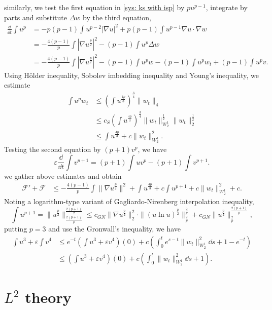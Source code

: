 similarly, we test the first equation in \eqref{sys: ks with isp} by $pu^{p-1}$, integrate by parts and substitute $\Delta w$ by the third equation,
\begin{align*}
  \frac{\dd}{\dd t}\int u^p &= -p(p-1)\int u^{p-2}|\nabla u|^2 
  + p(p-1)\int u^{p-1}\nabla u\cdot\nabla w\\
  &= -\frac{4(p-1)}{p}\int |\nabla u^{\frac{p}2}|^2 - (p-1)\int u^p\Delta w\\
  &= -\frac{4(p-1)}{p}\int |\nabla u^{\frac{p}2}|^2 
  - (p-1)\int u^p w - (p-1)\int u^pw_t + (p-1)\int u^p v.
\end{align*} 
Using H\"older inequality, Sobolev imbedding inequality and Young's inequality, we estimate
\begin{align*}
    \int u^pw_t &\leq\left(\int u^{\frac{4p}3}\right)^{\frac34}\|w_t\|_4\\
    &\leq c_S\left(\int u^{\frac{4p}3}\right)^{\frac34}\|w_t\|_{W^1_2}^{\frac12}\|w_t\|_2^{\frac12}\\
    &\leq \int u^{\frac{4p}{3}} + c\|w_t\|_{W^1_2}^2.
\end{align*}
Testing the second equation by $(p+1)v^p$, we have
\[
    \varepsilon\frac{\dd}{\dd t}\int v^{p+1} = (p+1)\int uv^p - (p+1)\int v^{p+1}.
\]
we gather above estimates and obtain 
\begin{align*}
    \mathcal{F}' + \mathcal{F} &\leq
    - \frac{4(p-1)}{p}\int\|\nabla u^{\frac{p}{2}}\|^2
    + \int u^{\frac{4p}3} + c\int u^{p+1} + c\|w_t\|_{W^1_2}^2 + c.
\end{align*} 
Noting a logarithm-type variant of Gagliardo-Nirenberg interpolation inequality,
\[
    \int u^{p+1} = \|u^{\frac{p}{2}}\|_{\frac{2(p+1)}{p}}^{\frac{2(p+1)}{2}}
    \leq c_{GN}\|\nabla u^{\frac{p}{2}}\|_2^2\cdot
    \|(u\ln u)^{\frac{p}{2}}\|_{\frac{2}{p}}^{\frac2p}
    + c_{GN}\|u^{\frac{p}{2}}\|_{\frac2p}^{\frac{2(p+1)}{p}},
\] 
putting $p=3$ and use the Gronwall's inequality, we have
\begin{align*}
    \int u^3 + \varepsilon\int v^4 &\leq
    e^{-t}(\int u^3 + \varepsilon v^4)(0)
    + c(\int_0^te^{s-t}\|w_t\|_{W^1_2}^2\dd s + 1 - e^{-t})\\
    &\leq (\int u^3 + \varepsilon v^4)(0)
    + c(\int_0^t\|w_t\|_{W^1_2}^2\dd s + 1).
\end{align*}

\section{\texorpdfstring{$L^2$}{L2} theory}


